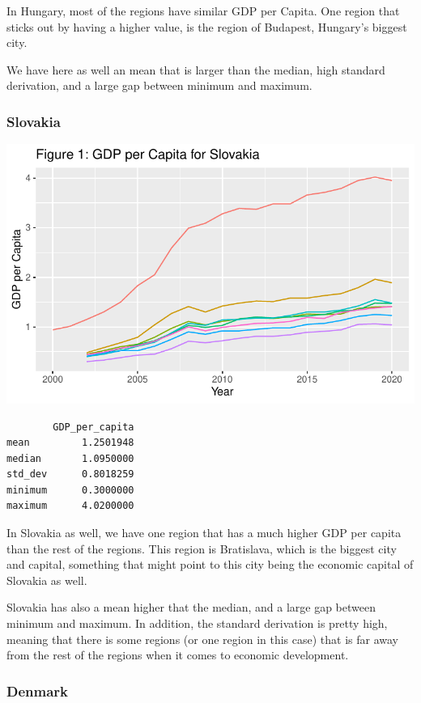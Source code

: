 \documentclass[
  a4paper,
  DIV=11,
  numbers=noendperiod]{scrartcl}
\begin{document}
In Hungary, most of the regions have similar GDP per Capita. One region
that sticks out by having a higher value, is the region of Budapest,
Hungary's biggest city.

We have here as well an mean that is larger than the median, high
standard derivation, and a large gap between minimum and maximum.

\hypertarget{slovakia}{%
\subsubsection{Slovakia}\label{slovakia}}

\includegraphics{assignment_1_files/figure-pdf/unnamed-chunk-16-1.pdf}

\begin{verbatim}
        GDP_per_capita
mean         1.2501948
median       1.0950000
std_dev      0.8018259
minimum      0.3000000
maximum      4.0200000
\end{verbatim}

In Slovakia as well, we have one region that has a much higher GDP per
capita than the rest of the regions. This region is Bratislava, which is
the biggest city and capital, something that might point to this city
being the economic capital of Slovakia as well.

Slovakia has also a mean higher that the median, and a large gap between
minimum and maximum. In addition, the standard derivation is pretty
high, meaning that there is some regions (or one region in this case)
that is far away from the rest of the regions when it comes to economic
development.

\hypertarget{denmark}{%
\subsubsection{Denmark}\label{denmark}}
\end{document}
